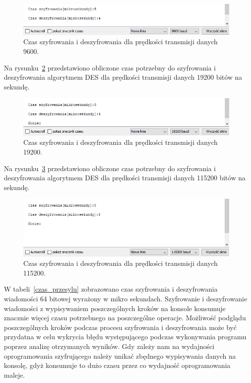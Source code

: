 \documentclass[12p]{article}
\begin{document}
\begin{figure}[H]
\centering
\includegraphics[width=12cm]{szy_desz_9600.png}
\caption{Czas szyfrowania i deszyfrowania dla prędkości transmisji danych 9600.}\label{9600}
\end{figure}

Na rysunku~\ref{19200} przedstawiono obliczone czas potrzebny do szyfrowania i deszyfrowania algorytmem DES dla prędkości transmisji danych 19200 bitów na sekundę.

\begin{figure}[H]
\centering
\includegraphics[width=12cm]{szy_desz_19200.png}
\caption{Czas szyfrowania i deszyfrowania dla prędkości transmisji danych 19200.}\label{19200}
\end{figure}

Na rysunku~\ref{115200} przedstawiono obliczone czas potrzebny do szyfrowania i deszyfrowania algorytmem DES dla prędkości transmisji danych 115200 bitów na sekundę.

\begin{figure}[H]
\centering
\includegraphics[width=12cm]{szy_desz_115200.png}
\caption{Czas szyfrowania i deszyfrowania dla prędkości transmisji danych 115200.}\label{115200}
\end{figure}

W tabeli~\ref{czas_przesylu} zobrazowano czas szyfrowania i deszyfrowania wiadomości 64 bitowej wyrażony w mikro sekundach. Szyfrowanie i deszyfrowanie wiadomości z wypisywaniem poszczególnych kroków na konsole konsumuje znacznie więcej czasu potrzebnego na poszczególne operacje. Możliwość podglądu poszczególnych kroków podczas procesu szyfrowania i deszyfrowania może być przydatna w celu wykrycia błędu występującego podczas wykonywania programu poprzez analizę otrzymanych wyników. Gdy zależy nam na wydajności oprogramowania szyfrującego należy unikać zbędnego wypisywania danych na konsolę, gdyż konsumuje to dużo czasu przez co wydajność oprogramowania maleje.  
\end{document}
